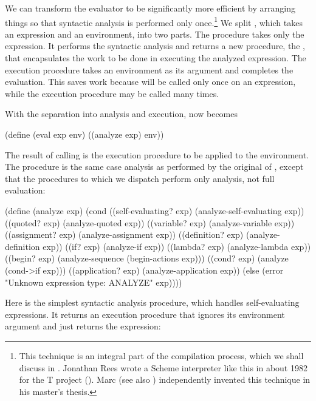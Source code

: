 We can transform the evaluator to be significantly more efficient by arranging
things so that syntactic analysis is performed only once.\footnote{This
technique is an integral part of the compilation process, which we shall
discuss in .  Jonathan Rees wrote a Scheme interpreter like this
in about 1982 for the T project ().  Marc  (see
also ) independently invented this technique in his
master's thesis.} We split , which takes an expression and an
environment, into two parts.  The procedure  takes only the
expression.  It performs the syntactic analysis and returns a new procedure,
the , that encapsulates the work to be done in
executing the analyzed expression.  The execution procedure takes an
environment as its argument and completes the evaluation.  This saves work
because  will be called only once on an expression, while the
execution procedure may be called many times.

With the separation into analysis and execution,  now becomes

\begin{codeBlock}
(define (eval exp env) ((analyze exp) env))
\end{codeBlock}

\noindent
The result of calling  is the execution procedure to be applied
to the environment.  The  procedure is the same case analysis as
performed by the original  of , except that the
procedures to which we dispatch perform only analysis, not full evaluation:

\begin{codeBlock}
(define (analyze exp)
  (cond ((self-evaluating? exp)
          (analyze-self-evaluating exp))
        ((quoted? exp) (analyze-quoted exp))
        ((variable? exp) (analyze-variable exp))
        ((assignment? exp) (analyze-assignment exp))
        ((definition? exp) (analyze-definition exp))
        ((if? exp) (analyze-if exp))
        ((lambda? exp) (analyze-lambda exp))
        ((begin? exp)
          (analyze-sequence (begin-actions exp)))
        ((cond? exp) (analyze (cond->if exp)))
        ((application? exp) (analyze-application exp))
        (else
          (error "Unknown expression type: ANALYZE" exp))))
\end{codeBlock}

\noindent
Here is the simplest syntactic analysis procedure, which handles
self-evaluating expressions.  It returns an execution procedure that ignores
its environment argument and just returns the expression:

